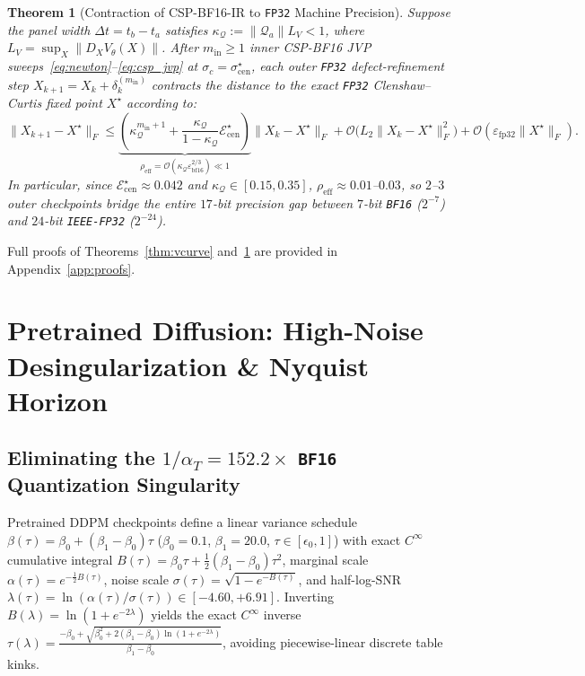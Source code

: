 \documentclass[11pt,a4paper]{article}
\newtheorem{theorem}{Theorem}
\theoremstyle{definition}
\theoremstyle{remark}
\newcommand{\bfsixteen}{\texttt{BF16}}
\newcommand{\fpthirtytwo}{\texttt{FP32}}
\newcommand{\epsbf}{\varepsilon_{\mathrm{bf16}}}
\newcommand{\epsfp}{\varepsilon_{\mathrm{fp32}}}
\begin{document}
\begin{theorem}[Contraction of \textsc{CSP-BF16-IR} to \fpthirtytwo{} Machine Precision]
\label{thm:convergence}
Suppose the panel width $\Delta t = t_b - t_a$ satisfies $\kappa_{\mathcal{Q}} := \|\mathcal{Q}_a\| L_V < 1$, where $L_V = \sup_X \|D_X V_\theta(X)\|$. After $m_{\mathrm{in}} \ge 1$ inner \textsc{CSP-BF16} JVP sweeps~\eqref{eq:newton}--\eqref{eq:csp_jvp} at $\sigma_c = \sigma_{\mathrm{cen}}^\star$, each outer \fpthirtytwo{} defect-refinement step $X_{k+1} = X_k + \delta_k^{(m_{\mathrm{in}})}$ contracts the distance to the exact \fpthirtytwo{} Clenshaw--Curtis fixed point $X^\star$ according to:
\begin{equation}
\label{eq:contraction}
    \|X_{k+1} - X^\star\|_F \le \underbrace{\left(\kappa_{\mathcal{Q}}^{m_{\mathrm{in}}+1} + \frac{\kappa_{\mathcal{Q}}}{1 - \kappa_{\mathcal{Q}}}\mathcal{E}_{\mathrm{cen}}^\star\right)}_{\rho_{\mathrm{eff}} = \mathcal{O}(\kappa_{\mathcal{Q}}\epsbf^{2/3}) \ll 1} \|X_k - X^\star\|_F + \mathcal{O}\big(L_2 \|X_k - X^\star\|_F^2\big) + \mathcal{O}(\epsfp \|X^\star\|_F).
\end{equation}
In particular, since $\mathcal{E}_{\mathrm{cen}}^\star \approx 0.042$ and $\kappa_{\mathcal{Q}} \in [0.15, 0.35]$, $\rho_{\mathrm{eff}} \approx 0.01$--$0.03$, so $2$--$3$ outer checkpoints bridge the entire $17$-bit precision gap between $7$-bit \bfsixteen{} ($2^{-7}$) and $24$-bit \texttt{IEEE-FP32} ($2^{-24}$).
\end{theorem}
Full proofs of Theorems~\ref{thm:vcurve} and~\ref{thm:convergence} are provided in Appendix~\ref{app:proofs}.

\section{Pretrained Diffusion: High-Noise Desingularization \& Nyquist Horizon}
\label{sec:diffusion}

\subsection{Eliminating the $1/\alpha_T = 152.2\times$ \bfsixteen{} Quantization Singularity}
Pretrained DDPM checkpoints \citep{ho2020denoising} define a linear variance schedule $\beta(\tau) = \beta_0 + (\beta_1 - \beta_0)\tau$ ($\beta_0 = 0.1$, $\beta_1 = 20.0$, $\tau \in [\epsilon_0, 1]$) with exact $C^\infty$ cumulative integral $B(\tau) = \beta_0 \tau + \frac{1}{2}(\beta_1 - \beta_0)\tau^2$, marginal scale $\alpha(\tau) = e^{-\frac{1}{2}B(\tau)}$, noise scale $\sigma(\tau) = \sqrt{1 - e^{-B(\tau)}}$, and half-log-SNR $\lambda(\tau) = \ln(\alpha(\tau)/\sigma(\tau)) \in [-4.60, +6.91]$. Inverting $B(\lambda) = \ln(1 + e^{-2\lambda})$ yields the exact $C^\infty$ inverse $\tau(\lambda) = \frac{-\beta_0 + \sqrt{\beta_0^2 + 2(\beta_1 - \beta_0)\ln(1 + e^{-2\lambda})}}{\beta_1 - \beta_0}$, avoiding piecewise-linear discrete table kinks.
\end{document}
